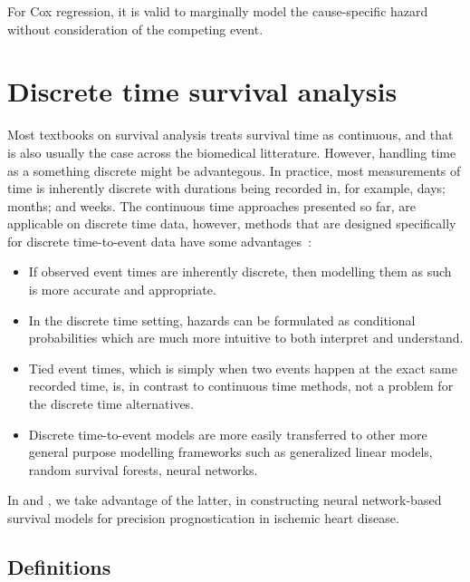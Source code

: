 For Cox regression, it is valid to marginally model the cause-specific hazard
without consideration of the competing event.

\section{Discrete time survival analysis}

Most textbooks on survival analysis treats survival time as continuous, 
and that is also usually the case across the biomedical litterature.
However, handling time as a something discrete might be advantegous.
In practice, most measurements of time is inherently discrete 
with durations being recorded in, for example, days; months; and weeks.
The continuous time approaches presented so far, 
are applicable on discrete time data,
however, methods that are designed specifically for discrete time-to-event 
data have some advantages~\autocite{tutzModeling2016}:

\begin{itemize}
    \item If observed event times are inherently discrete, 
        then modelling them as such is more accurate and appropriate. 
    \item In the discrete time setting, hazards can be formulated as 
        conditional probabilities which are much more intuitive to 
        both interpret and understand.
    \item Tied event times, 
        which is simply when two events happen at the exact same recorded time,
        is, in contrast to continuous time methods,
        not a problem for the discrete time alternatives.
    \item Discrete time-to-event models are more easily transferred to 
        other more general purpose modelling frameworks 
        such as generalized linear models, random survival forests, 
        neural networks.
\end{itemize}

In  and , 
we take advantage of the latter,
in constructing neural network-based survival models
for precision prognostication in ischemic heart disease.

\subsection{Definitions}

